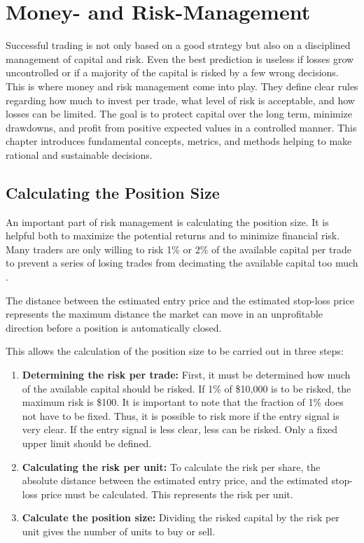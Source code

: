 \section{Money- and Risk-Management}
\label{chap:risk-man}

Successful trading is not only based on a good strategy but also on a disciplined management of capital and risk.
Even the best prediction is useless if losses grow uncontrolled or if a majority of the capital is risked by a few wrong decisions.
This is where money and risk management come into play.
They define clear rules regarding how much to invest per trade, what level of risk is acceptable, and how losses can be limited.
The goal is to protect capital over the long term, minimize drawdowns, and profit from positive expected values in a controlled manner.
This chapter introduces fundamental concepts, metrics, and methods helping to make rational and sustainable decisions.

\subsection{Calculating the Position Size}

An important part of risk management is calculating the position size.
It is helpful both to maximize the potential returns and to minimize financial risk.
Many traders are only willing to risk 1\% or 2\% of the available capital per trade to prevent a series of losing trades from decimating the available capital too much \cite{1-2-prozent}.

The distance between the estimated entry price and the estimated stop-loss price represents the maximum distance the market can move in an unprofitable direction before a position is automatically closed.

This allows the calculation of the position size to be carried out in three steps:

\begin{enumerate}
    \item \textbf{Determining the risk per trade:} First, it must be determined how much of the available capital should be risked.
    If 1\% of \$10,000 is to be risked, the maximum risk is \$100.
    It is important to note that the fraction of 1\% does not have to be fixed.
    Thus, it is possible to risk more if the entry signal is very clear.
    If the entry signal is less clear, less can be risked.
    Only a fixed upper limit should be defined.
    \item \textbf{Calculating the risk per unit:} To calculate the risk per share, the absolute distance between the estimated entry price, and the estimated stop-loss price must be calculated.
    This represents the risk per unit.
    \item \textbf{Calculate the position size:} Dividing the risked capital by the risk per unit gives the number of units to buy or sell.
\end{enumerate}

